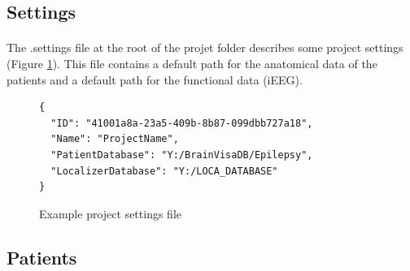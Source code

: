 \documentclass[a4paper]{article}
\begin{document}
\subsection{Settings}
\paragraph{} The .settings file at the root of the projet folder describes some project settings (Figure \ref{projectSettings}). This file contains a default path for the anatomical data of the patients and a default path for the functional data (iEEG).
\begin{figure}[H]
\begin{lstlisting}
{
  "ID": "41001a8a-23a5-409b-8b87-099dbb727a18",
  "Name": "ProjectName",
  "PatientDatabase": "Y:/BrainVisaDB/Epilepsy",
  "LocalizerDatabase": "Y:/LOCA_DATABASE"
}
\end{lstlisting}
\caption{\label{projectSettings}Example project settings file}
\end{figure}
\subsection{Patients}
\end{document}
